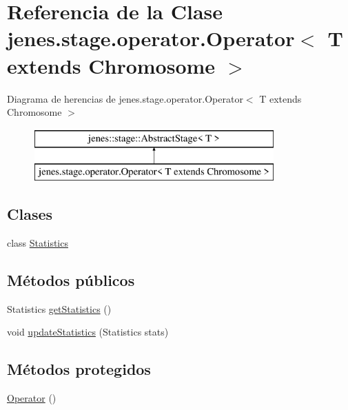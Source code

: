 \hypertarget{classjenes_1_1stage_1_1operator_1_1_operator_3_01_t_01extends_01_chromosome_01_4}{\section{Referencia de la Clase jenes.\-stage.\-operator.\-Operator$<$ T extends Chromosome $>$}
\label{classjenes_1_1stage_1_1operator_1_1_operator_3_01_t_01extends_01_chromosome_01_4}
}
Diagrama de herencias de jenes.\-stage.\-operator.\-Operator$<$ T extends Chromosome $>$\begin{figure}[H]
\begin{center}
\leavevmode
\includegraphics[height=2.000000cm]{classjenes_1_1stage_1_1operator_1_1_operator_3_01_t_01extends_01_chromosome_01_4}
\end{center}
\end{figure}
\subsection*{Clases}
\begin{DoxyCompactItemize}
\item 
class \hyperlink{classjenes_1_1stage_1_1operator_1_1_operator_3_01_t_01extends_01_chromosome_01_4_1_1_statistics}{Statistics}
\end{DoxyCompactItemize}
\subsection*{Métodos públicos}
\begin{DoxyCompactItemize}
\item 
Statistics \hyperlink{classjenes_1_1stage_1_1operator_1_1_operator_3_01_t_01extends_01_chromosome_01_4_abf64e7c4d53509dd770fa09ca9cf377d}{get\-Statistics} ()
\item 
void \hyperlink{classjenes_1_1stage_1_1operator_1_1_operator_3_01_t_01extends_01_chromosome_01_4_a11ffd92acef6de663583899707cbbab9}{update\-Statistics} (Statistics stats)
\end{DoxyCompactItemize}
\subsection*{Métodos protegidos}
\begin{DoxyCompactItemize}
\item 
\hyperlink{classjenes_1_1stage_1_1operator_1_1_operator_3_01_t_01extends_01_chromosome_01_4_a23b4b18468c2fa30bd89fa9e962f6eb8}{Operator} ()
\end{DoxyCompactItemize}
